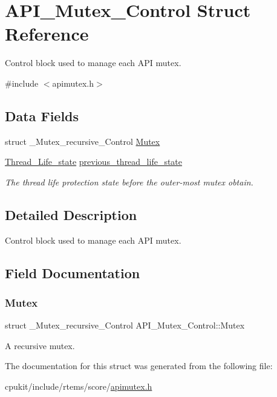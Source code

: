 \hypertarget{structAPI__Mutex__Control}{}\section{A\+P\+I\+\_\+\+Mutex\+\_\+\+Control Struct Reference}
\label{structAPI__Mutex__Control}


Control block used to manage each A\+PI mutex.  




{\ttfamily \#include $<$apimutex.\+h$>$}

\subsection*{Data Fields}
\begin{DoxyCompactItemize}
\item 
struct \+\_\+\+Mutex\+\_\+recursive\+\_\+\+Control \mbox{\hyperlink{structAPI__Mutex__Control_aecb6fdf030b714eab8385e4eadef8229}{Mutex}}
\item 
\mbox{\label{structAPI__Mutex__Control_a46c1ce229c0929bab0d5f7f666f8645d}} 
\mbox{\hyperlink{group__RTEMSScoreThread_ga0b4c61e432a0c21855e3122bb394583d}{Thread\+\_\+\+Life\+\_\+state}} \mbox{\hyperlink{structAPI__Mutex__Control_a46c1ce229c0929bab0d5f7f666f8645d}{previous\+\_\+thread\+\_\+life\+\_\+state}}
\begin{DoxyCompactList}\small\item\em The thread life protection state before the outer-\/most mutex obtain. \end{DoxyCompactList}\end{DoxyCompactItemize}


\subsection{Detailed Description}
Control block used to manage each A\+PI mutex. 

\subsection{Field Documentation}
\mbox{\label{structAPI__Mutex__Control_aecb6fdf030b714eab8385e4eadef8229}} 
\subsubsection{\texorpdfstring{Mutex}{Mutex}}
{\footnotesize\ttfamily struct \+\_\+\+Mutex\+\_\+recursive\+\_\+\+Control A\+P\+I\+\_\+\+Mutex\+\_\+\+Control\+::\+Mutex}

A recursive mutex. 

The documentation for this struct was generated from the following file\+:\begin{DoxyCompactItemize}
\item 
cpukit/include/rtems/score/\mbox{\hyperlink{apimutex_8h}{apimutex.\+h}}\end{DoxyCompactItemize}
